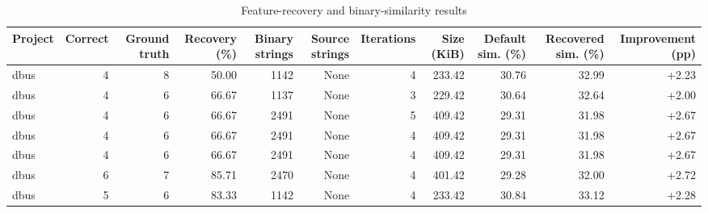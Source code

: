 \begin{table}[htbp]
\centering
\caption{Feature-recovery and binary-similarity results}
\label{tab:feature-recovery-results}
\small
\begin{tabular}{lrrrrrrrrrr}
\toprule
Project & Correct & Ground truth & Recovery (\%) & Binary strings & Source strings & Iterations & Size (KiB) & Default sim. (\%) & Recovered sim. (\%) & Improvement (pp) \\
\midrule
dbus & 4 & 8 & 50.00 & 1142 & None & 4 & 233.42 & 30.76 & 32.99 & +2.23 \\
dbus & 4 & 6 & 66.67 & 1137 & None & 3 & 229.42 & 30.64 & 32.64 & +2.00 \\
dbus & 4 & 6 & 66.67 & 2491 & None & 5 & 409.42 & 29.31 & 31.98 & +2.67 \\
dbus & 4 & 6 & 66.67 & 2491 & None & 4 & 409.42 & 29.31 & 31.98 & +2.67 \\
dbus & 4 & 6 & 66.67 & 2491 & None & 4 & 409.42 & 29.31 & 31.98 & +2.67 \\
dbus & 6 & 7 & 85.71 & 2470 & None & 4 & 401.42 & 29.28 & 32.00 & +2.72 \\
dbus & 5 & 6 & 83.33 & 1142 & None & 4 & 233.42 & 30.84 & 33.12 & +2.28 \\
\bottomrule
\end{tabular}
\end{table}
